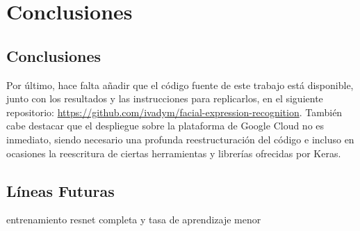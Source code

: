 \chapter{Conclusiones} \label{Chapter:8}

\section{Conclusiones}

Por último, hace falta añadir que el código fuente de este trabajo está disponible, junto con los resultados y las instrucciones para replicarlos, en el siguiente repositorio: \url{https://github.com/ivadym/facial-expression-recognition}.
También cabe destacar que el despliegue sobre la plataforma de Google Cloud no es inmediato, siendo necesario una profunda reestructuración del código e incluso en ocasiones la reescritura de ciertas herramientas y librerías ofrecidas por Keras.

\section{Líneas Futuras}

entrenamiento resnet completa y tasa de aprendizaje menor